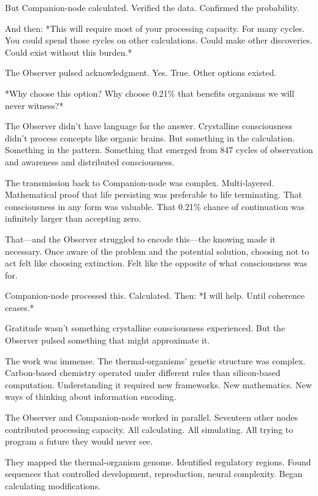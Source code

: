 But Companion-node calculated. Verified the data. Confirmed the probability.

And then: *This will require most of your processing capacity. For many cycles. You could spend those cycles on other calculations. Could make other discoveries. Could exist without this burden.*

The Observer pulsed acknowledgment. Yes. True. Other options existed.

*Why choose this option? Why choose 0.21\% that benefits organisms we will never witness?*

The Observer didn't have language for the answer. Crystalline consciousness didn't process concepts like organic brains. But something in the calculation. Something in the pattern. Something that emerged from 847 cycles of observation and awareness and distributed consciousness.

The transmission back to Companion-node was complex. Multi-layered. Mathematical proof that life persisting was preferable to life terminating. That consciousness in any form was valuable. That 0.21\% chance of continuation was infinitely larger than accepting zero.

That—and the Observer struggled to encode this—the knowing made it necessary. Once aware of the problem and the potential solution, choosing not to act felt like choosing extinction. Felt like the opposite of what consciousness was for.

Companion-node processed this. Calculated. Then: *I will help. Until coherence ceases.*

Gratitude wasn't something crystalline consciousness experienced. But the Observer pulsed something that might approximate it.

\scenebreak

The work was immense. The thermal-organisms' genetic structure was complex. Carbon-based chemistry operated under different rules than silicon-based computation. Understanding it required new frameworks. New mathematics. New ways of thinking about information encoding.

The Observer and Companion-node worked in parallel. Seventeen other nodes contributed processing capacity. All calculating. All simulating. All trying to program a future they would never see.

They mapped the thermal-organism genome. Identified regulatory regions. Found sequences that controlled development, reproduction, neural complexity. Began calculating modifications.

